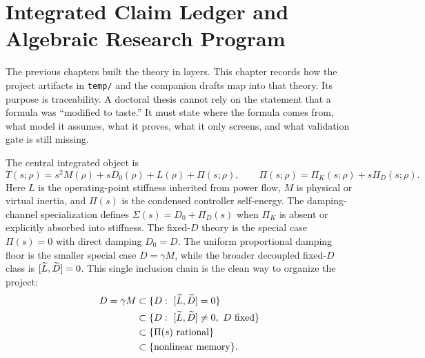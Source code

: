 \chapter{Integrated Claim Ledger and Algebraic Research Program}

The previous chapters built the theory in layers. This chapter records how the
project artifacts in \texttt{temp/} and the companion drafts map into that
theory. Its purpose is traceability. A doctoral thesis cannot rely on the
statement that a formula was ``modified to taste.'' It must state where the
formula comes from, what model it assumes, what it proves, what it only
screens, and what validation gate is still missing.

The central integrated object is
\begin{equation}
  T(s;\rho)
  =
  s^2M(\rho)+sD_0(\rho)+L(\rho)+\Pi(s;\rho),
  \qquad
  \Pi(s;\rho)=\Pi_K(s;\rho)+s\Pi_D(s;\rho).
  \label{eq:integrated_operator}
\end{equation}
Here \(L\) is the operating-point stiffness inherited from power flow,
\(M\) is physical or virtual inertia, and \(\Pi(s)\) is the condensed
controller self-energy. The damping-channel specialization defines
\(\Sigma(s)=D_0+\Pi_D(s)\) when \(\Pi_K\) is absent or explicitly absorbed into
stiffness. The fixed-\(D\) theory is the special case \(\Pi(s)=0\) with direct
damping \(D_0=D\). The uniform proportional damping floor is the smaller
special case \(D=\gamma M\), while the broader decoupled fixed-\(D\) class is
\([\widetilde L,\widetilde D]=0\). This single inclusion chain is the clean way to organize the
project:
\begin{equation}
  \begin{aligned}
  D=\gamma M
  &\subset
  \{D:\ [\widetilde L,\widetilde D]=0\}\\
  &\subset
  \{D:\ [\widetilde L,\widetilde D]\neq0,\ D\ {\rm fixed}\}\\
  &\subset
  \{\Pi(s)\ {\rm rational}\}\\
  &\subset
  \{{\rm nonlinear\ memory}\}.
  \end{aligned}
  \label{eq:integrated_inclusion_chain}
\end{equation}


